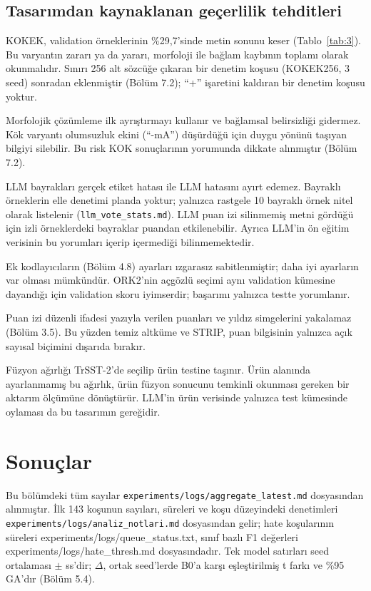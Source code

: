 \documentclass[11pt]{article}
\begin{document}
\subsection{Tasarımdan kaynaklanan geçerlilik tehditleri}

KOKEK, validation örneklerinin \%29,7'sinde metin sonunu keser (Tablo~\ref{tab:3}). Bu varyantın zararı ya da yararı, morfoloji ile bağlam kaybının toplamı olarak okunmalıdır. Sınırı 256 alt sözcüğe çıkaran bir denetim koşusu (KOKEK256, 3 seed) sonradan eklenmiştir (Bölüm 7.2); ``+'' işaretini kaldıran bir denetim koşusu yoktur.

Morfolojik çözümleme ilk ayrıştırmayı kullanır ve bağlamsal belirsizliği gidermez. Kök varyantı olumsuzluk ekini (``-mA'') düşürdüğü için duygu yönünü taşıyan bilgiyi silebilir. Bu risk KOK sonuçlarının yorumunda dikkate alınmıştır (Bölüm 7.2).

LLM bayrakları gerçek etiket hatası ile LLM hatasını ayırt edemez. Bayraklı örneklerin elle denetimi planda yoktur; yalnızca rastgele 10 bayraklı örnek nitel olarak listelenir (\texttt{llm\_\allowbreak{}\allowbreak{}vote\_\allowbreak{}\allowbreak{}stats.\allowbreak{}\allowbreak{}md}). LLM puan izi silinmemiş metni gördüğü için izli örneklerdeki bayraklar puandan etkilenebilir. Ayrıca LLM'in ön eğitim verisinin bu yorumları içerip içermediği bilinmemektedir.

Ek kodlayıcıların (Bölüm 4.8) ayarları ızgarasız sabitlenmiştir; daha iyi ayarların var olması mümkündür. ORK2'nin açgözlü seçimi aynı validation kümesine dayandığı için validation skoru iyimserdir; başarımı yalnızca testte yorumlanır.

Puan izi düzenli ifadesi yazıyla verilen puanları ve yıldız simgelerini yakalamaz (Bölüm 3.5). Bu yüzden temiz altküme ve STRIP, puan bilgisinin yalnızca açık sayısal biçimini dışarıda bırakır.

Füzyon ağırlığı TrSST-2'de seçilip ürün testine taşınır. Ürün alanında ayarlanmamış bu ağırlık, ürün füzyon sonucunu temkinli okunması gereken bir aktarım ölçümüne dönüştürür. LLM'in ürün verisinde yalnızca test kümesinde oylaması da bu tasarımın gereğidir.

\section{Sonuçlar}\label{sec:6}

Bu bölümdeki tüm sayılar \texttt{experiments/\allowbreak{}\allowbreak{}logs/\allowbreak{}\allowbreak{}aggregate\_\allowbreak{}\allowbreak{}latest.\allowbreak{}\allowbreak{}md} dosyasından alınmıştır. İlk 143 koşunun sayıları, süreleri ve koşu düzeyindeki denetimleri \texttt{experiments/\allowbreak{}\allowbreak{}logs/\allowbreak{}\allowbreak{}analiz\_\allowbreak{}\allowbreak{}notlari.\allowbreak{}\allowbreak{}md} dosyasından gelir; hate koşularının süreleri experiments/\allowbreak{}logs/\allowbreak{}queue\_\allowbreak{}status.txt, sınıf bazlı F1 değerleri experiments/\allowbreak{}logs/\allowbreak{}hate\_\allowbreak{}thresh.md dosyasındadır. Tek model satırları seed ortalaması $\pm$ ss'dir; $\Delta$, ortak seed'lerde B0'a karşı eşleştirilmiş t farkı ve \%95 GA'dır (Bölüm 5.4).
\end{document}
